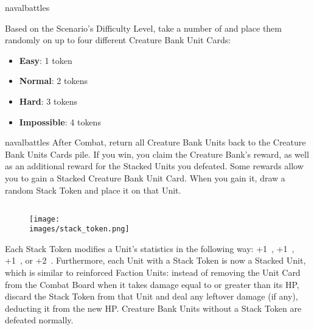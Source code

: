 \begin{expansion}[before=\vspace*{-11mm}]{navalbattles}
\begin{multicols*}{2}
  Based on the Scenario's Difficulty Level, take a number of  and place them randomly on up to four different Creature Bank Unit Cards:
  \begin{itemize}
    \item \textbf{Easy}: 1 token
    \item \textbf{Normal}: 2 tokens
    \item \textbf{Hard}: 3 tokens
    \item \textbf{Impossible}: 4 tokens
  \end{itemize}

  \end{multicols*}
\end{expansion}

\begin{multicols*}{2}
\begin{expansion}[before=\vspace*{-11mm}]{navalbattles}
  After Combat, return all Creature Bank Units back to the Creature Bank Units Cards pile.
  If you win, you claim the Creature Bank's reward, as well as an additional reward for the Stacked Units you defeated.
  Some rewards allow you to gain a Stacked Creature Bank Unit Card.
  When you gain it, draw a random Stack Token and place it on that Unit.\\


  \subsection*{}
  \setlength\intextsep{0pt}
  \setlength\columnsep{1em}
  \begin{wrapfigure}{r}{0.2\linewidth}
    \texttt{[image: \\images/stack\_token.png]}
  \end{wrapfigure}
  Each Stack Token modifies a Unit's statistics in the following way: +1~, +1~, +1~, or +2~.
  Furthermore, each Unit with a Stack Token is now a Stacked Unit, which is similar to reinforced Faction Units: instead of removing the Unit Card from the Combat Board when it takes damage equal to or greater than its HP, discard the Stack Token from that Unit and deal any leftover damage (if any), deducting it from the new HP.
  Creature Bank Units without a Stack Token are defeated normally.
\end{expansion}


\end{multicols*}
